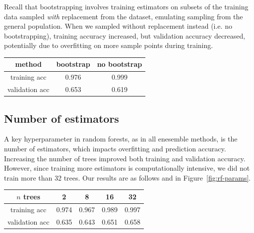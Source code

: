 \documentclass{article}
\begin{document}
\begin{multicols}{2}
Recall that bootstrapping involves
training estimators on subsets of the training data
sampled \emph{with} replacement from the dataset,
emulating sampling from the general population.
When we sampled without replacement instead
(i.e. no bootstrapping),
training accuracy increased,
but validation accuracy decreased,
potentially due to overfitting on more sample points during training.

%
\begin{center}
    \begin{tabular}{c| c c}
        method & bootstrap & no bootstrap \\\hline
        training acc
        		& 0.976 & 0.999 \\
        validation acc
        		& 0.653 & 0.619
    \end{tabular}
\end{center}

\subsection{Number of estimators}

A key hyperparameter in random forests,
as in all enesemble methods, is the number of estimators,
which impacts overfitting and prediction accuracy.
Increasing the number of trees
improved both training and validation accuracy.
However, since training more estimators
is computationally intensive,
we did not train more than 32 trees.
Our results are as follows and in Figure~\ref{fig:rf-params}.
%
%
%
\begin{center}
    \begin{tabular}{c|c c c c}
        $n$ trees
        		& 2 & 8 & 16 & 32 \\\hline
        training acc
        		& 0.974 & 0.967 & 0.989 & 0.997\\
        validation acc
        		& 0.635 & 0.643 & 0.651 & 0.658
    \end{tabular}
\end{center}


\end{multicols}
\end{document}
